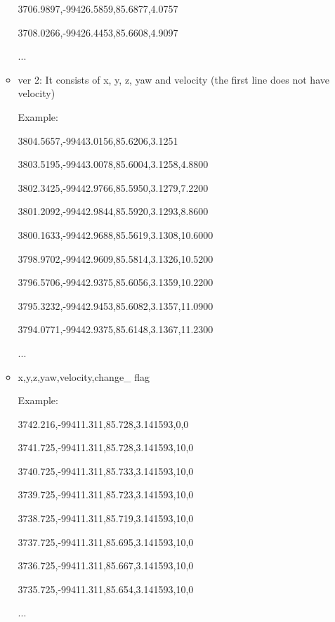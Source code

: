 \documentclass[
10pt, %
a4paper, %
oneside, %
BCOR5mm, %
]{scrartcl}
\begin{document}
\begin{itemize}
\begin{itemize}
    3706.9897,-99426.5859,85.6877,4.0757
    
    3708.0266,-99426.4453,85.6608,4.9097
    
    ... 
    
    \item ver 2: It consists of x, y, z, yaw and velocity (the first line does not have velocity)
    
    Example: 
    
    3804.5657,-99443.0156,85.6206,3.1251
    
3803.5195,-99443.0078,85.6004,3.1258,4.8800

3802.3425,-99442.9766,85.5950,3.1279,7.2200

3801.2092,-99442.9844,85.5920,3.1293,8.8600

3800.1633,-99442.9688,85.5619,3.1308,10.6000

3798.9702,-99442.9609,85.5814,3.1326,10.5200

3796.5706,-99442.9375,85.6056,3.1359,10.2200

3795.3232,-99442.9453,85.6082,3.1357,11.0900

3794.0771,-99442.9375,85.6148,3.1367,11.2300

... 
    
    
 \item  x,y,z,yaw,velocity,change\_ flag
 
 Example:
 
3742.216,-99411.311,85.728,3.141593,0,0

3741.725,-99411.311,85.728,3.141593,10,0

3740.725,-99411.311,85.733,3.141593,10,0

3739.725,-99411.311,85.723,3.141593,10,0

3738.725,-99411.311,85.719,3.141593,10,0

3737.725,-99411.311,85.695,3.141593,10,0

3736.725,-99411.311,85.667,3.141593,10,0

3735.725,-99411.311,85.654,3.141593,10,0

... 
	\end{itemize}
	
\end{itemize}



 





\renewcommand{\refname}{\spacedlowsmallcaps{References}} %




\end{document}

